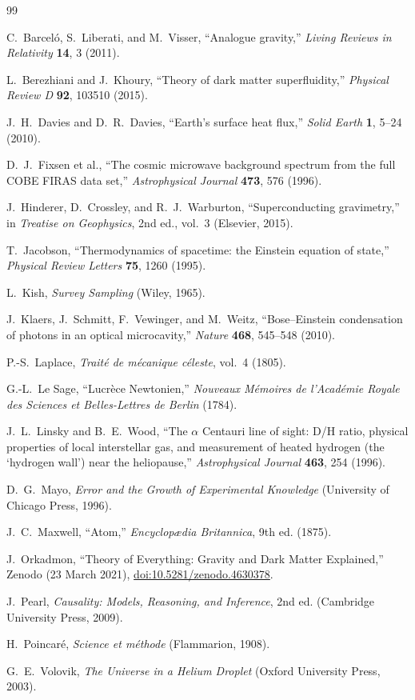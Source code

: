 \documentclass[11pt]{article}
\begin{document}
\begin{thebibliography}{99}

C.~Barcel\'o, S.~Liberati, and M.~Visser, ``Analogue gravity,'' \emph{Living Reviews in Relativity} \textbf{14}, 3 (2011).

L.~Berezhiani and J.~Khoury, ``Theory of dark matter superfluidity,'' \emph{Physical Review D} \textbf{92}, 103510 (2015).

J.~H.~Davies and D.~R.~Davies, ``Earth's surface heat flux,'' \emph{Solid Earth} \textbf{1}, 5--24 (2010).

D.~J.~Fixsen et al., ``The cosmic microwave background spectrum from the full COBE FIRAS data set,'' \emph{Astrophysical Journal} \textbf{473}, 576 (1996).

J.~Hinderer, D.~Crossley, and R.~J.~Warburton, ``Superconducting gravimetry,'' in \emph{Treatise on Geophysics}, 2nd ed., vol.~3 (Elsevier, 2015).

T.~Jacobson, ``Thermodynamics of spacetime: the Einstein equation of state,'' \emph{Physical Review Letters} \textbf{75}, 1260 (1995).

L.~Kish, \emph{Survey Sampling} (Wiley, 1965).

J.~Klaers, J.~Schmitt, F.~Vewinger, and M.~Weitz, ``Bose--Einstein condensation of photons in an optical microcavity,'' \emph{Nature} \textbf{468}, 545--548 (2010).

P.-S.~Laplace, \emph{Trait\'e de m\'ecanique c\'eleste}, vol.~4 (1805).

G.-L.~Le Sage, ``Lucr\`ece Newtonien,'' \emph{Nouveaux M\'emoires de l'Acad\'emie Royale des Sciences et Belles-Lettres de Berlin} (1784).

J.~L.~Linsky and B.~E.~Wood, ``The $\alpha$ Centauri line of sight: D/H ratio, physical properties of local interstellar gas, and measurement of heated hydrogen (the `hydrogen wall') near the heliopause,'' \emph{Astrophysical Journal} \textbf{463}, 254 (1996).

D.~G.~Mayo, \emph{Error and the Growth of Experimental Knowledge} (University of Chicago Press, 1996).

J.~C.~Maxwell, ``Atom,'' \emph{Encyclop\ae dia Britannica}, 9th ed. (1875).

J.~Orkadmon, ``Theory of Everything: Gravity and Dark Matter Explained,'' Zenodo (23 March 2021), \href{https://doi.org/10.5281/zenodo.4630378}{doi:10.5281/zenodo.4630378}.

J.~Pearl, \emph{Causality: Models, Reasoning, and Inference}, 2nd ed. (Cambridge University Press, 2009).

H.~Poincar\'e, \emph{Science et m\'ethode} (Flammarion, 1908).

G.~E.~Volovik, \emph{The Universe in a Helium Droplet} (Oxford University Press, 2003).

\end{thebibliography}
\end{document}
